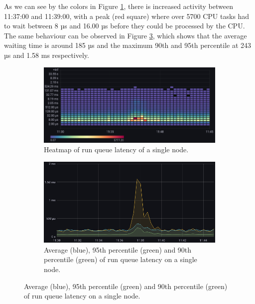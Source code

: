 \documentclass[lettersize,journal]{IEEEtran}
\begin{document}
	As we can see by the colors in Figure \ref{fig:results:runqlat:a}, there is increased activity between 11:37:00 and 11:39:00, with a peak (red square) where over 5700 CPU tasks had to wait between 8 µs and 16.00 µs before they could be processed by the CPU.
	The same behaviour can be observed in Figure \ref{fig:results:runqlat:b}, which shows that the average waiting time is around 185 µs and the maximum 90th and 95th percentile at 243 µs and 1.58 ms respectively.
	\begin{figure}[h]
		\begin{subfigure}
			\centering
			\includegraphics[width=\linewidth]{images/results_runqlat_latency.png}
			\caption{Heatmap of run queue latency of a single node.}
			\label{fig:results:runqlat:a}
		\end{subfigure}
		\hfill
		\begin{subfigure}
			\centering
			\includegraphics[width=\linewidth]{images/results_runqlat_percentile.png}
			\caption{Average (blue), 95th percentile (green) and 90th percentile (green) of run queue latency on a single node.}
			\label{fig:results:runqlat:b}
		\end{subfigure}
	\end{figure}
	
\end{document}
